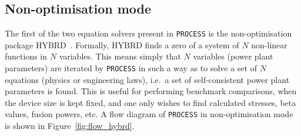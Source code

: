 \documentclass[11pt,a4paper]{report}
\newcommand{\process}{\mbox{\texttt{PROCESS}}}
\begin{document}
\subsection{Non-optimisation mode}

The first of the two equation solvers present in \process\/ is the
non-optimisation package HYBRD~\cite{hybrd_anl,hybrd}. Formally, HYBRD
finds a zero of a system of $N$ non-linear functions in $N$ variables. This
means simply that $N$ variables (power plant parameters) are iterated by
\process\/ in such a way as to solve a set of $N$ equations (physics or
engineering laws), i.e.\ a set of self-consistent power plant parameters is
found. This is useful for performing benchmark comparisons, when the device
size is kept fixed, and one only wishes to find calculated stresses, beta
values, fusion powers, etc. A flow diagram of \process\/ in non-optimisation
mode is shown in Figure~\ref{fig:flow_hybrd}.


\setlength{\unitlength}{1mm}
\end{document}
